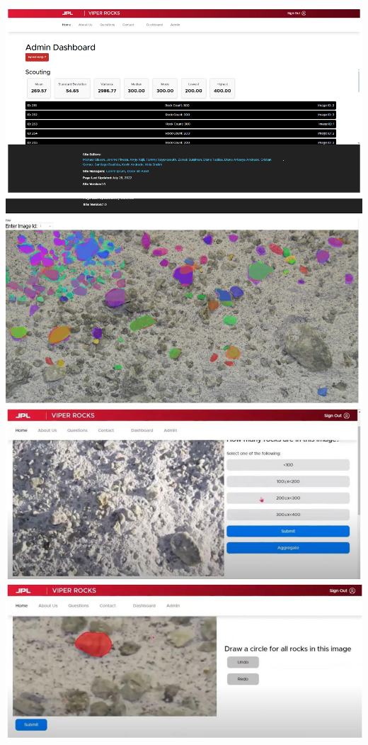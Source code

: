 \documentclass{article}
\begin{document}
\includegraphics{admin_dashboard_page}
\includegraphics{scouting_page}
\includegraphics{scouting_page_2}
\includegraphics{sizing_page}
\end{document}
